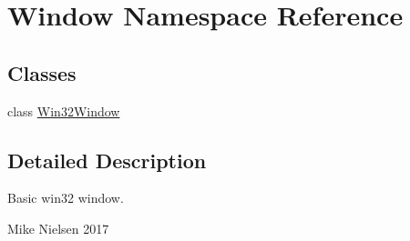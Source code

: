 \hypertarget{namespace_window}{}\section{Window Namespace Reference}
\label{namespace_window}
\subsection*{Classes}
\begin{DoxyCompactItemize}
\item 
class \mbox{\hyperlink{class_window_1_1_win32_window}{Win32\+Window}}
\end{DoxyCompactItemize}


\subsection{Detailed Description}
Basic win32 window.

Mike Nielsen 2017 